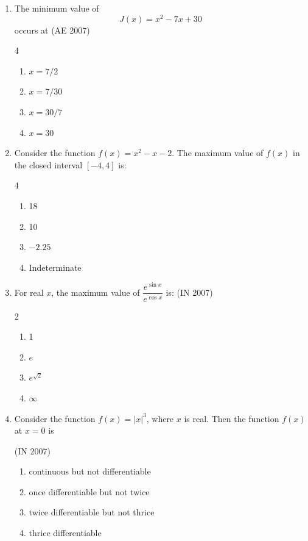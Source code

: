 \begin{enumerate}[label=\thesubsection.\arabic*,ref=\thesubsection.\theenumi]
    \item The minimum value of 
	    $$J(x) = x^2 - 7x + 30$$ occurs at
	    \hfill (AE 2007)
    \begin{multicols}{4}
    \begin{enumerate}
        \item $x = 7/2$ 
        \item $x = 7/30$ 
        \item $x = 30/7$ 
        \item $x = 30$
    \end{enumerate}
    \end{multicols}
\item Consider the function $f(x) = x^2 - x -2$. The maximum value of $f(x)$ in the closed interval $[-4,4]$ is:
\hfill{}
\begin{multicols}{4}
\begin{enumerate}
    \item 18
    \item 10
    \item $-2.25$
    \item Indeterminate
\end{enumerate}
\end{multicols}
\item For real $ x $, the maximum value of $ \dfrac{e^{\sin x}}{e^{\cos x}} $ is:
\hfill(IN 2007)
\begin{multicols}{2}
\begin{enumerate}
\item 1
\item $ e $
\item $ e^{\sqrt{2}} $
\item $ \infty $
\end{enumerate}
\end{multicols}

\item Consider the function $f(x) = |x|^3$, where $x$ is real. Then the function $f(x)$ at $x=0$ is 

\hfill(IN 2007)
\begin{enumerate}
\item continuous but not differentiable  
\item once differentiable but not twice  
\item twice differentiable but not thrice  
\item thrice differentiable  
\end{enumerate}


\end{enumerate}
